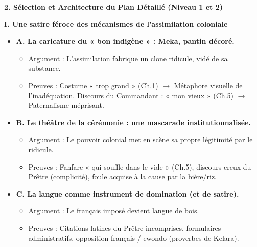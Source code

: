 \documentclass[11pt]{article}
\begin{document}
\begin{exoresolu}
\textbf{2. Sélection et Architecture du Plan Détaillé (Niveau 1 et 2)}

\textbf{I. Une satire féroce des mécanismes de l'assimilation coloniale}
\begin{itemize}
    \item \textbf{A. La caricature du « bon indigène » : Meka, pantin décoré.}
    \begin{itemize}
        \item Argument : L'assimilation fabrique un clone ridicule, vidé de sa substance.
        \item Preuves : Costume « trop grand » (Ch.1) $\to$ Métaphore visuelle de l'inadéquation. Discours du Commandant : « mon vieux » (Ch.5) $\to$ Paternalisme méprisant.
    \end{itemize}
    \item \textbf{B. Le théâtre de la cérémonie : une mascarade institutionnalisée.}
    \begin{itemize}
        \item Argument : Le pouvoir colonial met en scène sa propre légitimité par le ridicule.
        \item Preuves : Fanfare « qui souffle dans le vide » (Ch.5), discours creux du Prêtre (complicité), foule acquise à la cause par la bière/riz.
    \end{itemize}
    \item \textbf{C. La langue comme instrument de domination (et de satire).}
    \begin{itemize}
        \item Argument : Le français imposé devient langue de bois.
        \item Preuves : Citations latines du Prêtre incomprises, formulaires administratifs, opposition français / ewondo (proverbes de Kelara).
    \end{itemize}
\end{itemize}


\end{exoresolu}
\end{document}
